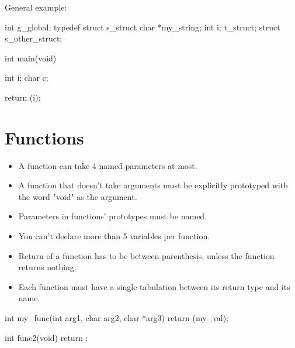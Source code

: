 \documentclass{42-en}
\begin{document}
\vspace{1cm}

            General example:
            \begin{42ccode}
int             g_global;
typedef struct  s_struct
{
    char    *my_string;
    int     i;
}               t_struct;
struct          s_other_struct;

int     main(void)
{
    int     i;
    char    c;

    return (i);
}
            \end{42ccode}
            \newpage

    \section{Functions}

        \begin{itemize}

            \item A function can take 4 named parameters at most.

            \item A function that doesn't take arguments must be
                explicitly prototyped with the word "void" as the
                argument.

            \item Parameters in functions' prototypes must be named.

            \item You can't declare more than 5 variables per function.

            \item Return of a function has to be between parenthesis, unless the
              function returns nothing.

            \item Each function must have a single tabulation between its
                return type and its name.

        \end{itemize}

\vspace{1cm}
        
            \begin{42ccode}
int my_func(int arg1, char arg2, char *arg3)
{
    return (my_val);
}

int func2(void)
{
    return ;
}
            \end{42ccode}
\end{document}
